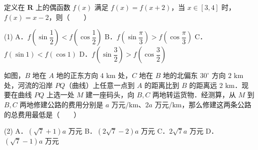 \begin{question}
定义在 $\mathbf{R}$ 上的偶函数 $f(x)$ 满足 $f(x) = f(x + 2)$，当 $x \in [3, 4]$ 时，$f(x) = x - 2$，则\mbox{（　　）}

\begin{gkopts}(1)
\task A．$f\left(\sin\dfrac{1}{2}\right) < f\left(\cos\dfrac{1}{2}\right)$
\task B．$f\left(\sin\dfrac{\pi}{3}\right) > f\left(\cos\dfrac{\pi}{3}\right)$
\task C．$f(\sin 1) < f(\cos 1)$
\task D．$f\left(\sin\dfrac{3}{2}\right) > f\left(\cos\dfrac{3}{2}\right)$
\end{gkopts}

\Needspace{0.4\textheight}
\end{question}
\begin{question}
如图，$B$ 地在 $A$ 地的正东方向 $4\text{ km}$ 处，$C$ 地在 $B$ 地的北偏东 $30^\circ$ 方向 $2\text{ km}$ 处，河流的沿岸 $PQ$（曲线）上任意一点到 $A$ 的距离比到 $B$ 的距离远 $2\text{ km}$．现要在曲线 $PQ$ 上选一处 $M$ 建一座码头，向 $B, C$ 两地转运货物．经测算，从 $M$ 到 $B, C$ 两地修建公路的费用分别是 $a$ 万元/$\text{km}$、$2a$ 万元/$\text{km}$，那么修建这两条公路的总费用最低是\mbox{（　　）}

\begin{gkopts}(2)
\task A．$(\sqrt{7} + 1)a$ 万元
\task B．$(2\sqrt{7} - 2)a$ 万元
\task C．$2\sqrt{7}a$ 万元
\task D．$(\sqrt{7} - 1)a$ 万元
\end{gkopts}
\nopagebreak[4]
\begin{center}\end{center}
\nopagebreak[4]
\end{question}

